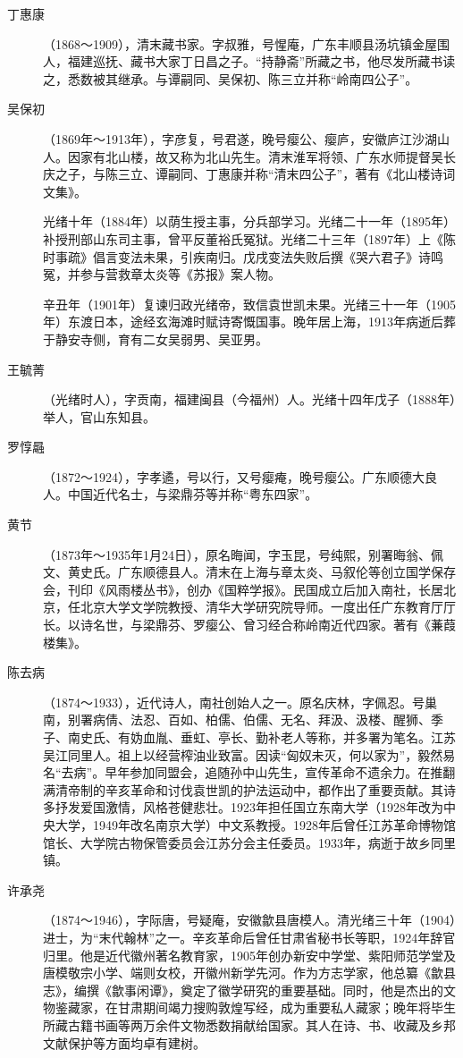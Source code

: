 \begin{description}
  \item[丁惠康] （1868～1909），清末藏书家。字叔雅，号惺庵，广东丰顺县汤坑镇金屋围人，福建巡抚、藏书大家丁日昌之子。“持静斋”所藏之书，他尽发所藏书读之，悉数被其继承。与谭嗣同、吴保初、陈三立并称“岭南四公子”。
  \item[吴保初] （1869年～1913年），字彦复，号君遂，晚号瘿公、瘿庐，安徽庐江沙湖山人。因家有北山楼，故又称为北山先生。清末淮军将领、广东水师提督吴长庆之子，与陈三立、谭嗣同、丁惠康并称“清末四公子”，著有《北山楼诗词文集》。\par
        光绪十年（1884年）以荫生授主事，分兵部学习。光绪二十一年（1895年）补授刑部山东司主事，曾平反董裕氏冤狱。光绪二十三年（1897年）上《陈时事疏》倡言变法未果，引疾南归。戊戌变法失败后撰《哭六君子》诗鸣冤，并参与营救章太炎等《苏报》案人物。\par
        辛丑年（1901年）复谏归政光绪帝，致信袁世凯未果。光绪三十一年（1905年）东渡日本，途经玄海滩时赋诗寄慨国事。晚年居上海，1913年病逝后葬于静安寺侧，育有二女吴弱男、吴亚男。
  \item[王毓菁] （光绪时人），字贡南，福建闽县（今福州）人。光绪十四年戊子（1888年）举人，官山东知县。
  \item[罗惇曧] （1872～1924），字孝遹，号以行，又号瘿痷，晚号瘿公。广东顺德大良人。中国近代名士，与梁鼎芬等并称“粤东四家”。
  \item[黄节] （1873年～1935年1月24日），原名晦闻，字玉昆，号纯熙，别署晦翁、佩文、黄史氏。广东顺德县人。清末在上海与章太炎、马叙伦等创立国学保存会，刊印《风雨楼丛书》，创办《国粹学报》。民国成立后加入南社，长居北京，任北京大学文学院教授、清华大学研究院导师。一度出任广东教育厅厅长。以诗名世，与梁鼎芬、罗瘿公、曾习经合称岭南近代四家。著有《蒹葭楼集》。
  \item[陈去病] （1874～1933），近代诗人，南社创始人之一。原名庆林，字佩忍。号巢南，别署病倩、法忍、百如、柏儒、伯儒、无名、拜汲、汲楼、醒狮、季子、南史氏、有妫血胤、垂虹、亭长、勤补老人等称，并多署为笔名。江苏吴江同里人。祖上以经营榨油业致富。因读“匈奴未灭，何以家为”，毅然易名“去病”。早年参加同盟会，追随孙中山先生，宣传革命不遗余力。在推翻满清帝制的辛亥革命和讨伐袁世凯的护法运动中，都作出了重要贡献。其诗多抒发爱国激情，风格苍健悲壮。1923年担任国立东南大学（1928年改为中央大学，1949年改名南京大学）中文系教授。1928年后曾任江苏革命博物馆馆长、大学院古物保管委员会江苏分会主任委员。1933年，病逝于故乡同里镇。
  \item[许承尧] （1874～1946），字际唐，号疑庵，安徽歙县唐模人。清光绪三十年（1904）进士，为“末代翰林”之一。辛亥革命后曾任甘肃省秘书长等职，1924年辞官归里。他是近代徽州著名教育家，1905年创办新安中学堂、紫阳师范学堂及唐模敬宗小学、端则女校，开徽州新学先河。作为方志学家，他总纂《歙县志》，编撰《歙事闲谭》，奠定了徽学研究的重要基础。同时，他是杰出的文物鉴藏家，在甘肃期间竭力搜购敦煌写经，成为重要私人藏家；晚年将毕生所藏古籍书画等两万余件文物悉数捐献给国家。其人在诗、书、收藏及乡邦文献保护等方面均卓有建树。

\end{description}
